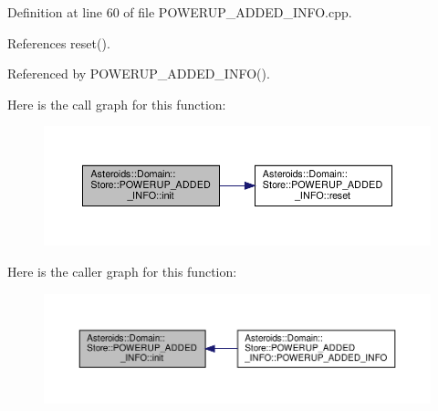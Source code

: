 Definition at line 60 of file P\+O\+W\+E\+R\+U\+P\+\_\+\+A\+D\+D\+E\+D\+\_\+\+I\+N\+F\+O.\+cpp.



References reset().



Referenced by P\+O\+W\+E\+R\+U\+P\+\_\+\+A\+D\+D\+E\+D\+\_\+\+I\+N\+F\+O().

Here is the call graph for this function\+:\nopagebreak
\begin{figure}[H]
\begin{center}
\leavevmode
\includegraphics[width=350pt]{classAsteroids_1_1Domain_1_1Store_1_1POWERUP__ADDED__INFO_ae3ef91a132b9a5f545d11630ef2466d4_cgraph}
\end{center}
\end{figure}
Here is the caller graph for this function\+:\nopagebreak
\begin{figure}[H]
\begin{center}
\leavevmode
\includegraphics[width=350pt]{classAsteroids_1_1Domain_1_1Store_1_1POWERUP__ADDED__INFO_ae3ef91a132b9a5f545d11630ef2466d4_icgraph}
\end{center}
\end{figure}
\mbox{\label{classAsteroids_1_1Domain_1_1Store_1_1POWERUP__ADDED__INFO_ae972bd3da19ae2dfea1230920b0aafc4}} 
